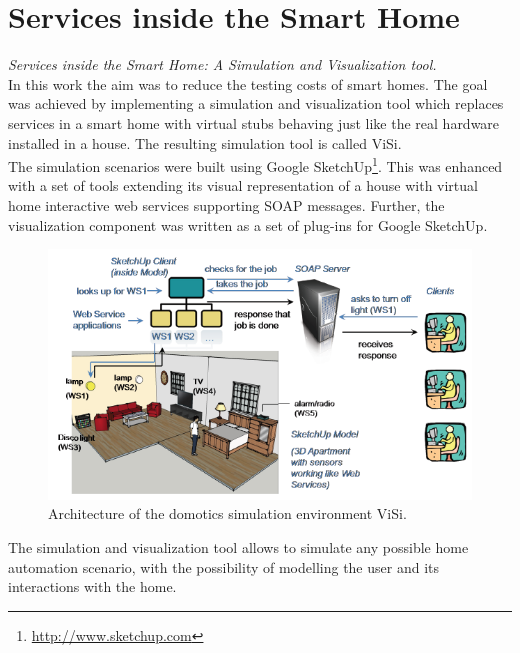 \section{Services inside the Smart Home}\label{sec:services_in_smart_homes}
\emph{Services inside the Smart Home: A Simulation and Visualization tool.}\\

In this work \cite{lazovik2009services} the aim was to reduce the testing costs of smart homes. The goal was achieved by implementing a simulation and visualization tool which replaces services in a smart home with virtual stubs behaving just like the real hardware installed in a house. The resulting simulation tool is called ViSi.\\

The simulation scenarios were built using Google SketchUp\footnote{\url{http://www.sketchup.com}}. This was enhanced with a set of tools extending its visual representation of a house with virtual home interactive web services supporting SOAP messages. Further, the visualization component was written as a set of plug-ins for Google SketchUp.\\

\begin{figure}[H]
	\centering
	\includegraphics[width=\linewidth]{gfx/Chapter2/services_in_smarthomes}
	\caption{Architecture of the domotics simulation environment ViSi.}
	\label{fig:diasim_architecture}
\end{figure}

The simulation and visualization tool allows to simulate any possible home automation scenario, with the possibility of modelling the user and its interactions with the home.
